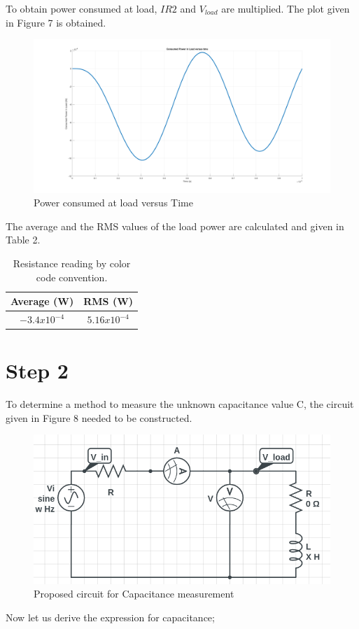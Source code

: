 \documentclass[letterpaper,12pt]{article}
\begin{document}
To obtain power consumed at load, \(IR2\) and \(V_{load}\) are multiplied. The plot given in Figure 7 is obtained.
\begin{figure}[H]
    \centering
    \includegraphics[width=1\textwidth]{2_2.png}
    \caption{Power consumed at load versus Time}
\end{figure} 
The average and the RMS values of the load power are calculated and given in Table 2.
\begin{table}[H]
    \begin{center}
        \caption{Resistance reading by color code convention.}
        \vspace{2mm}
        \begin{tabular}{||c | c ||} 
            \hline
            Average (W) & RMS (W) \\ [0.5ex] 
            \hline\hline
            \(-3.4x10^{-4}\) & \(5.16x10^{-4}\)  \\ 
            \hline
    \end{tabular}
\end{center}
\end{table}

\section{Step 2}
To determine a method to measure the unknown capacitance value C, the circuit given in Figure 8 needed to be constructed.
\begin{figure}[H]
    \centering
    \includegraphics[width=1\textwidth]{2SCH.png}
    \caption{Proposed circuit for Capacitance measurement}
\end{figure} 
Now let us derive the expression for capacitance;
\end{document}

